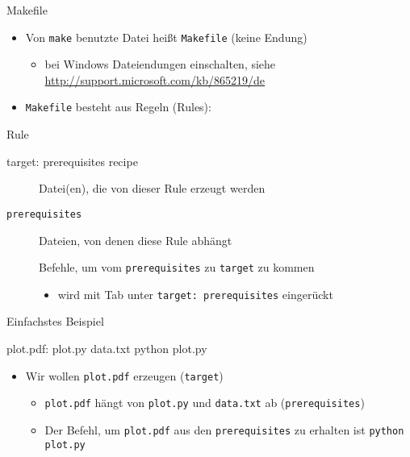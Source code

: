 \begin{frame}[fragile]{Makefile}
  \begin{itemize}
    \item Von \texttt{make} benutzte Datei heißt \texttt{Makefile} (keine Endung)
      \begin{itemize}
        \item bei Windows Dateiendungen einschalten, siehe \url{http://support.microsoft.com/kb/865219/de}
      \end{itemize}
    \item \texttt{Makefile} besteht aus Regeln (Rules):
  \end{itemize}
  \begin{block}{Rule}
    \centering
    \begin{lstmake}
      target: prerequisites
          recipe
    \end{lstmake}
  \end{block}
  \begin{description}
    \item[\texttt{\hphantom{prerequisites}}] Datei(en), die von dieser Rule erzeugt werden
    \item[\texttt{prerequisites}]                         Dateien, von denen diese Rule abhängt
    \item[\texttt{\hphantom{prerequisites}}] Befehle, um vom \texttt{prerequisites} zu \texttt{target} zu kommen
    \begin{itemize}
      \item wird mit Tab unter \texttt{target: prerequisites} eingerückt
    \end{itemize}
  \end{description}
\end{frame}

\begin{frame}[fragile]{Einfachstes Beispiel}
  \begin{center}
    \begin{lstmake}
      plot.pdf: plot.py data.txt
          python plot.py
    \end{lstmake}
  \end{center}
  \begin{itemize}
    \item Wir wollen \texttt{plot.pdf} erzeugen (\texttt{target})
    \begin{itemize}
      \item \texttt{plot.pdf} hängt von \texttt{plot.py} und \texttt{data.txt} ab (\texttt{prerequisites})
      \item Der Befehl, um \texttt{plot.pdf} aus den \texttt{prerequisites} zu erhalten ist \texttt{python plot.py}
    \end{itemize}
  \end{itemize}
\end{frame}

